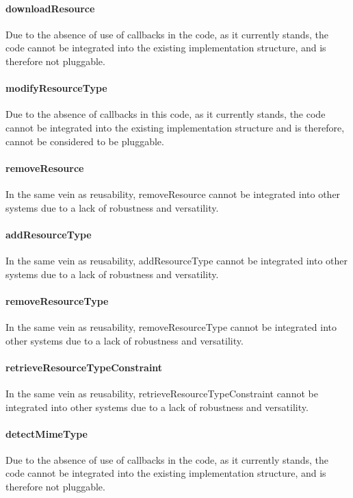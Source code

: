 \documentclass[a4paper]{article}
\begin{document}
\paragraph{downloadResource}
Due to the absence of use of callbacks in the code, as it currently stands, the code cannot be integrated into the existing implementation structure, and is therefore not pluggable.

\paragraph{modifyResourceType}
Due to the absence of callbacks in this code, as it currently stands, the code cannot be integrated into the existing implementation structure and is therefore, cannot be considered to be pluggable.

\paragraph{removeResource}
In the same vein as reusability, removeResource cannot be integrated into other systems due to a lack of robustness and versatility.

\paragraph{addResourceType}
In the same vein as reusability, addResourceType cannot be integrated into other systems due to a lack of robustness and versatility.

\paragraph{removeResourceType}
In the same vein as reusability, removeResourceType cannot be integrated into other systems due to a lack of robustness and versatility.

\paragraph{retrieveResourceTypeConstraint}
In the same vein as reusability, retrieveResourceTypeConstraint cannot be integrated into other systems due to a lack of robustness and versatility.

\paragraph{detectMimeType}
Due to the absence of use of callbacks in the code, as it currently stands, the code cannot be integrated into the existing implementation structure, and is therefore not pluggable.
\end{document}

